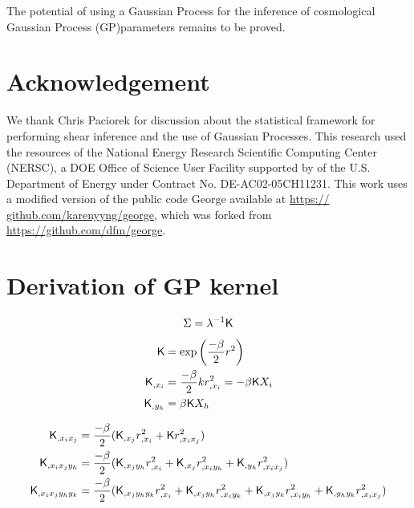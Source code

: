 The potential of using a Gaussian Process for the inference of cosmological 
Gaussian Process (GP)parameters remains to be proved. 

\section{Acknowledgement}
We thank Chris Paciorek for discussion about the statistical
framework for performing shear inference and the
use of Gaussian Processes.
This research
used the resources of the National Energy Research Scientific 
Computing Center (NERSC), a DOE Office of Science
User Facility supported by 
of the U.S. Department of Energy under Contract No.
DE-AC02-05CH11231.
 This work uses a modified version
of the public code {\sc George} available at \href{https://
github.com/karenyyng/george}{https://
github.com/karenyyng/george}, which was forked from \\
\href{https://github.com/dfm/george}{https://github.com/dfm/george}.



\appendix 

\section{Derivation of GP kernel}

\begin{equation*}
\Sigma = \lambda^{-1} \mathsf{K} 
\end{equation*}

\begin{align}
\mathsf{K} &= \exp{\left(\frac{-\beta}{2} r^2 \right)}\\
\mathsf{K}_{,x_i} &= \frac{-\beta}{2} k r^2_{,x_i} = -\beta \mathsf{K} X_i\\ 
\mathsf{K}_{,y_h} &= \beta \mathsf{K} X_h 
\end{align}

\begin{align}
\mathsf{K}_{,x_i x_j} &= \frac{-\beta}{2}(\mathsf{K}_{,x_j} r^2_{,x_i} + 
\mathsf{K} r^2_{,x_i x_j})\\
\mathsf{K}_{,x_i x_j y_h} &= \frac{-\beta}{2}(\mathsf{K}_{,x_j y_h} r^2_{,x_i} + \mathsf{K}_{,x_j}
r^2_{,x_i y_h} + \mathsf{K}_{,y_h} r^2_{,x_i x_j})\\
\mathsf{K}_{,x_i x_j y_h y_k} &= \frac{-\beta}{2} 
(\mathsf{K}_{,x_j y_h y_k} r^2_{,x_i} +
\mathsf{K}_{,x_j y_h} r^2_{,x_i y_k} + 
\mathsf{K}_{,x_j y_k} r^2_{,x_i y_h} + 
\mathsf{K}_{,y_h y_k} r^2_{,x_i x_j} )
\end{align}

